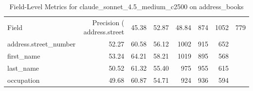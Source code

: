 \begin{table}
\caption{Field-Level Metrics for claude_sonnet_4.5_medium_c2500 on address_books}
\label{tab:fields_claude_sonnet_4.5_medium_c2500_address_books}
\begin{tabular}{lrrrrrr}
\toprule
Field & Precision (%
\midrule
address.street & 45.38 & 52.87 & 48.84 & 874 & 1052 & 779 \\
address.street_number & 52.27 & 60.58 & 56.12 & 1002 & 915 & 652 \\
first_name & 53.24 & 64.21 & 58.21 & 1019 & 895 & 568 \\
last_name & 50.52 & 61.32 & 55.40 & 975 & 955 & 615 \\
occupation & 49.68 & 60.87 & 54.71 & 924 & 936 & 594 \\
\bottomrule
\end{tabular}
\end{table}
